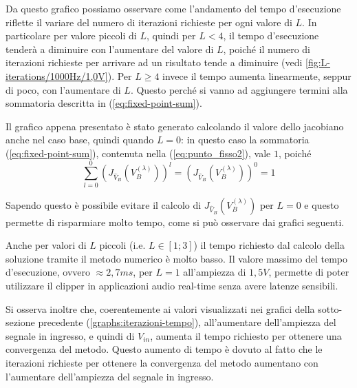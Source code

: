 			Da questo grafico possiamo osservare come l'andamento del tempo d'esecuzione riflette il variare del numero di iterazioni richieste per ogni valore di $L$. In particolare per valore piccoli di $L$, quindi per $L < 4$, il tempo d'esecuzione tenderà a diminuire con l'aumentare del valore di $L$, poiché il numero di iterazioni richieste per arrivare ad un risultato tende a diminuire (vedi \ref{fig:L-iterations/1000Hz/1,0V}). Per $L \ge 4$ invece il tempo aumenta linearmente, seppur di poco, con l'aumentare di $L$. Questo perché si vanno ad aggiungere termini alla sommatoria descritta in (\ref{eq:fixed-point-sum}).
			
			Il grafico appena presentato è stato generato calcolando il valore dello jacobiano anche nel caso base, quindi quando $L = 0$: in questo caso la sommatoria (\ref{eq:fixed-point-sum}), contenuta nella (\ref{eq:punto_fisso2}), vale $1$, poiché
			\[
				\sum_{l=0}^{0} \left(J_{\widehat V_{B}}(V_{B}^{(\lambda)})\right)^{l} = \left(J_{\widehat V_{B}}(V_{B}^{(\lambda)})\right)^{0} = 1
			\]
			
			Sapendo questo è possibile evitare il calcolo di $J_{\widehat V_{B}}(V_{B}^{(\lambda)})$ per $L = 0$ e questo permette di risparmiare molto tempo, come si può osservare dai grafici seguenti.
			
			\graficospace
			\graficospace
			\graficospace
			\graficospace
			\graficospace
			
			Anche per valori di $L$ piccoli (i.e. $L \in [1;3]$) il tempo richiesto dal calcolo della soluzione tramite il metodo numerico è molto basso. Il valore massimo del tempo d'esecuzione, ovvero $\approx 2,7ms$, per $L = 1$ all'ampiezza di $1,5V$, permette di poter utilizzare il clipper in applicazioni audio real-time senza avere latenze sensibili.
			
			Si osserva inoltre che, coerentemente ai valori visualizzati nei grafici della sotto-sezione precedente (\ref{graphs:iterazioni-tempo}), all'aumentare dell'ampiezza del segnale in ingresso, e quindi di $V_{in}$, aumenta il tempo richiesto per ottenere una convergenza del metodo. Questo aumento di tempo è dovuto al fatto che le iterazioni richieste per ottenere la convergenza del metodo aumentano con l'aumentare dell'ampiezza del segnale in ingresso.